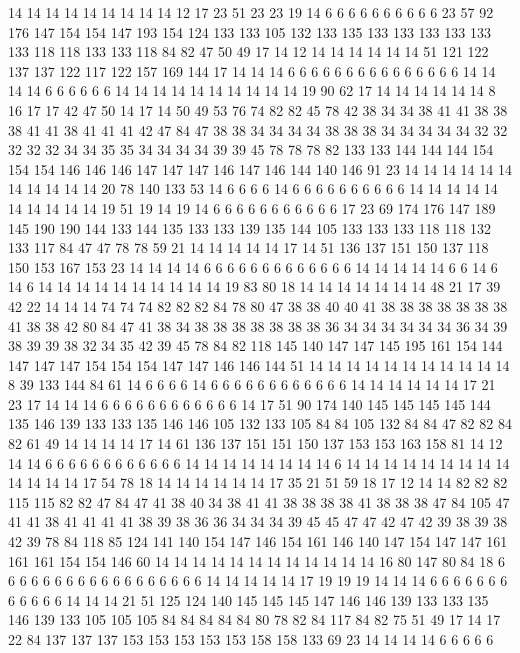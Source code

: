 14 14 14 14 14 14 14 14 14 12 17 23 51 23 23 19 14 6 6 6
6 6 6 6 6 6 6 23 57 92 176 147 154 154 147 193 154 124 133 133
105 132 133 135 133 133 133 133 133 133 118 118 133 133 118 84 82 47 50 49
17 14 12 14 14 14 14 14 14 51 121 122 137 137 122 117 122 157 169 144
17 14 14 14 6 6 6 6 6 6 6 6 6 6 6 6 6 6 6 14
14 14 14 6 6 6 6 6 6 14 14 14 14 14 14 14 14 14 14 19
90 62 17 14 14 14 14 14 14 8 16 17 17 42 47 50 14 17 14 50
49 53 76 74 82 82 45 78 42 38 34 34 38 41 41 38 38 38 41 41
38 41 41 41 42 47 84 47 38 38 34 34 34 34 38 38 38 34 34 34
34 34 32 32 32 32 32 34 34 35 35 34 34 34 34 39 39 45 78 78
78 82 133 133 144 144 144 154 154 154 146 146 146 147 147 147 146 147 146 144
140 146 91 23 14 14 14 14 14 14 14 14 14 14 14 20 78 140 133 53
14 6 6 6 6 14 6 6 6 6 6 6 6 6 6 6 14 14 14 14
14 14 14 14 14 14 19 51 19 14 19 14 6 6 6 6 6 6 6 6
6 6 6 17 23 69 174 176 147 189 145 190 190 144 133 144 135 133 133 139
135 144 105 133 133 133 118 118 132 133 117 84 47 47 78 78 59 21 14 14
14 14 14 17 14 51 136 137 151 150 137 118 150 153 167 153 23 14 14 14
14 6 6 6 6 6 6 6 6 6 6 6 6 6 14 14 14 14 14 6
6 14 6 14 6 14 14 14 14 14 14 14 14 14 14 19 83 80 18 14
14 14 14 14 14 14 48 21 17 39 42 22 14 14 14 74 74 74 82 82
82 84 78 80 47 38 38 40 40 41 38 38 38 38 38 38 38 41 38 38
42 80 84 47 41 38 34 38 38 38 38 38 38 38 36 34 34 34 34 34
34 36 34 39 38 39 39 38 32 34 35 42 39 45 78 84 82 118 145 140
147 147 145 195 161 154 144 147 147 147 154 154 154 147 147 146 146 144 51 14
14 14 14 14 14 14 14 14 14 14 8 39 133 144 84 61 14 6 6 6
6 14 6 6 6 6 6 6 6 6 6 6 6 6 14 14 14 14 14 14
17 21 23 17 14 14 14 6 6 6 6 6 6 6 6 6 6 6 6 14
17 51 90 174 140 145 145 145 145 144 135 146 139 133 133 135 146 146 105 132
133 105 84 84 105 132 84 84 47 82 82 84 82 61 49 14 14 14 14 17
14 61 136 137 151 151 150 137 153 153 163 158 81 14 12 14 14 6 6 6
6 6 6 6 6 6 6 6 6 14 14 14 14 14 14 14 14 6 14 14
14 14 14 14 14 14 14 14 14 14 14 17 54 78 18 14 14 14 14 14
14 17 35 21 51 59 18 17 12 14 14 82 82 82 115 115 82 82 47 84
47 41 38 40 34 38 41 41 38 38 38 38 41 38 38 38 47 84 105 47
41 41 38 41 41 41 41 38 39 38 36 36 34 34 34 39 45 45 47 47
42 47 42 39 38 39 38 42 39 78 84 118 85 124 141 140 154 147 146 154
161 146 140 147 154 147 147 161 161 161 154 154 146 60 14 14 14 14 14 14
14 14 14 14 14 14 16 80 147 80 84 18 6 6 6 6 6 6 6 6
6 6 6 6 6 6 6 6 6 6 14 14 14 14 14 17 19 19 19 14
14 14 6 6 6 6 6 6 6 6 6 6 6 6 14 14 14 21 51 125
124 140 145 145 145 147 146 146 139 133 133 135 146 139 133 105 105 105 84 84
84 84 84 80 78 82 84 117 84 82 75 51 49 17 14 17 22 84 137 137
137 153 153 153 153 153 158 158 133 69 23 14 14 14 14 6 6 6 6 6
